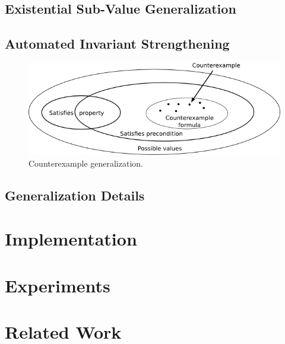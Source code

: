 \documentclass[10pt]{sigplanconf}
\begin{document}
\subsection{Existential Sub-Value Generalization}

\subsection{Automated Invariant Strengthening}

\begin{figure}[ht!]
  \begin{center}
    \includegraphics[scale=0.5]{Figs/cex-gen}
   \end{center}
  \caption{Counterexample generalization.}
  \label{fig:cex-gen}
\end{figure}


\subsection{Generalization Details}


\section{Implementation}



\section{Experiments}




\section{Related Work}
\label{sec:related}
\end{document}
